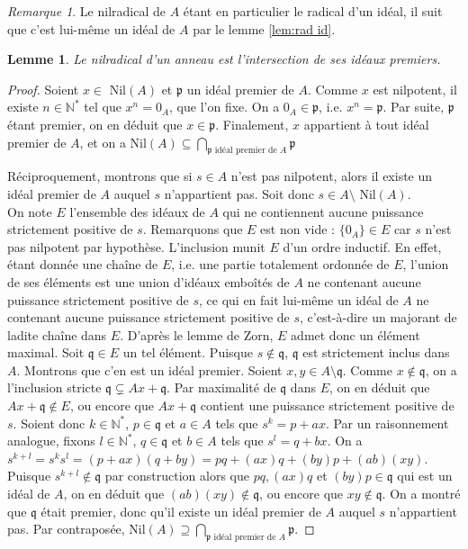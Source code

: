 \documentclass[10pt, twoside]{article}
\theoremstyle{plain}
\theoremstyle{definition}
\theoremstyle{plain}
\theoremstyle{plain}
\newtheorem{lemma}[theorem]{Lemme}
\theoremstyle{definition}
\theoremstyle{remark}
\newtheorem*{remark}{Remarque}
\begin{document}
\begin{remark}
    Le nilradical de $A$ étant en particulier le radical d'un idéal, il suit que c'est lui-même un idéal de $A$ par le lemme \ref{lem:rad id}.
\end{remark}

\begin{lemma}\label{lem:nilrad id prem}
    Le nilradical d'un anneau est l'intersection de ses idéaux premiers. 
\end{lemma}

\begin{proof}
    Soient $x \in$ Nil$(A)$ et $\mathfrak{p}$ un idéal premier de $A$. Comme $x$ est nilpotent, il existe $n \in \mathbb{N}^*$ tel que $x^n = 0_A$, que l'on fixe. On a $0_A \in \mathfrak{p}$, i.e. $x^n = \mathfrak{p}$. Par suite, $\mathfrak{p}$ étant premier, on en déduit que $x \in \mathfrak{p}$. Finalement, $x$ appartient à tout idéal premier de $A$, et on a  Nil$(A) \subseteq \bigcap\limits_{\mathfrak{p} \text{ idéal premier de } A} \mathfrak{p}$

    Réciproquement, montrons que si $s \in A$ n'est pas nilpotent, alors il existe un idéal premier de $A$ auquel $s$ n'appartient pas. Soit donc $s \in A \setminus$ Nil$(A)$.\\
    On note $E$ l'ensemble des idéaux de $A$ qui ne contiennent aucune puissance strictement positive de $s$. Remarquons que $E$ est non vide : $\{0_A\} \in E$ car $s$ n'est pas nilpotent par hypothèse. L'inclusion munit $E$ d'un ordre inductif. En effet, étant donnée une chaîne de $E$, i.e. une partie totalement ordonnée de $E$, l'union de ses éléments est une union d'idéaux emboîtés de $A$ ne contenant aucune puissance strictement positive de $s$, ce qui en fait lui-même un idéal de $A$ ne contenant aucune puissance strictement positive de $s$, c'est-à-dire un majorant de ladite chaîne dans $E$. D'après le lemme de Zorn, $E$ admet donc un élément maximal. Soit $\mathfrak{q} \in E$ un tel élément. Puisque $s \notin \mathfrak{q}$, $\mathfrak{q}$ est strictement inclus dans $A$. Montrons que c'en est un idéal premier. Soient $x, y \in A \setminus \mathfrak{q}$. Comme $x \notin \mathfrak{q}$, on a l'inclusion stricte $\mathfrak{q} \subsetneq Ax + \mathfrak{q}$. Par maximalité de $\mathfrak{q}$ dans $E$, on en déduit que $Ax + \mathfrak{q} \notin E$, ou encore que $Ax + \mathfrak{q}$ contient une puissance strictement positive de $s$. Soient donc $k \in \mathbb{N}^*$, $p \in \mathfrak{q}$ et $a \in A$ tels que $s^k = p + ax $. Par un raisonnement analogue, fixons $l \in \mathbb{N}^*$, $q \in \mathfrak{q}$ et $b \in A$ tels que $s^l = q + bx $.
    On a $s^{k+l} = s^k s^l = (p + ax)(q + by) = pq + (ax)q + (by)p + (ab)(xy)$. Puisque $s^{k+l} \notin \mathfrak{q}$ par construction alors que $pq, (ax)q$ et $(by)p \in \mathfrak{q}$ qui est un idéal de $A$, on en déduit que $(ab)(xy) \notin \mathfrak{q}$, ou encore que $xy \notin \mathfrak{q}$. On a montré que $\mathfrak{q}$ était premier, donc qu'il existe un idéal premier de $A$ auquel $s$ n'appartient pas.
    Par contraposée, Nil$(A) \supseteq \bigcap\limits_{\mathfrak{p} \text{ idéal premier de } A} \mathfrak{p}$.


\end{proof}
\end{document}

